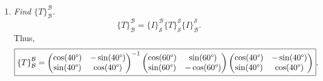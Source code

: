 \documentclass[12pt]{article}
\newcommand{\based}[3]{{\{#1\}}_{#2}^{#3}}
\begin{document}
\begin{enumerate}[label=(\alph*)]
	\item \textit{Find $\based{T}{\mathcal{B}}{\mathcal{B}}$.}
	\begin{equation*}
		\based{T}{\mathcal{B}}{\mathcal{B}}
		=
		\based{I}{\mathcal{S}}{\mathcal{B}}
		\based{T}{\mathcal{S}}{\mathcal{S}}
		\based{I}{\mathcal{B}}{\mathcal{S}}
		.
	\end{equation*}
	Thus,
	\footnotesize
	\begin{equation*}
		\boxed{
			\based{T}{\mathcal{B}}{\mathcal{B}}
			=
			\begin{pmatrix}
				\cos(40 \degree) & -\sin(40 \degree) \\
				\sin(40 \degree) & \cos(40 \degree)
			\end{pmatrix}
			^{-1}
			\begin{pmatrix}
				\cos(60 \degree) & \sin(60 \degree) \\
				\sin(60 \degree) & -\cos(60 \degree)
			\end{pmatrix}
			\begin{pmatrix}
				\cos(40 \degree) & -\sin(40 \degree) \\
				\sin(40 \degree) & \cos(40 \degree)
			\end{pmatrix}
		}
		.
	\end{equation*}
	\normalsize
\end{enumerate}
\end{document}
